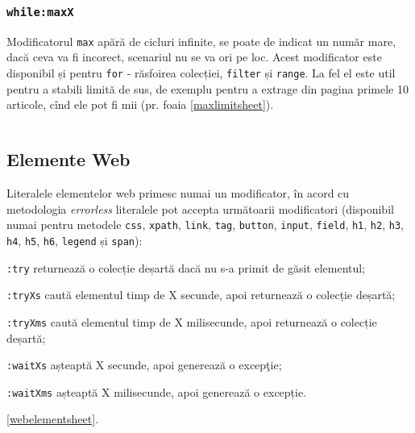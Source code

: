 \subsubsection{\texttt{while:maxX}}

Modificatorul \texttt{max} apără de cicluri infinite, se poate de indicat un număr mare, dacă ceva va fi incorect, scenariul nu se va ori pe loc. Acest modificator este disponibil și pentru \texttt{for} - răsfoirea colecției, \texttt{filter} și \texttt{range}. La fel el este util pentru a stabili limită de sus, de exemplu pentru a extrage din pagina primele 10 articole, cînd ele pot fi mii (pr. foaia \ref{maxlimitsheet}).

\begin{sourcecode}
    \label{maxlimitsheet}
    \inputminted[linenos]{icl}{../sources/maxlimitsheet.icL}
\end{sourcecode}

\subsection{Elemente Web}

Literalele elementelor web primesc numai un modificator, în acord cu metodologia {\it errorless} literalele pot accepta următoarii modificatori (disponibil numai pentru metodele \texttt{css}, \texttt{xpath}, \texttt{link}, \texttt{tag}, \texttt{button}, \texttt{input}, \texttt{field}, \texttt{h1}, \texttt{h2}, \texttt{h3}, \texttt{h4}, \texttt{h5}, \texttt{h6}, \texttt{legend} și \texttt{span}):
\begin{icItems}
	\item \texttt{:try} returnează o colecție deșartă dacă nu s-a primit de găsit elementul;
	\item \texttt{:tryXs} caută elementul timp de X secunde, apoi returnează o colecție deșartă;
	\item \texttt{:tryXms} caută elementul timp de X milisecunde, apoi returnează o colecție deșartă;
	\item  \texttt{:waitXs} așteaptă X secunde, apoi generează o excepţie;
	\item \texttt{:waitXms} așteaptă X milisecunde, apoi generează o excepție.
\end{icItems}

\ref{webelementsheet}.

\begin{sourcecode}
    \label{webelementsheet}
    \inputminted[linenos]{icl}{../sources/webelementsheet.icL}
\end{sourcecode}

